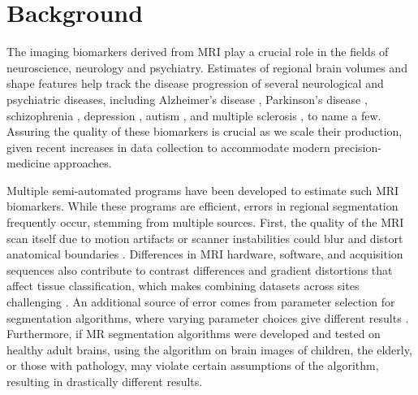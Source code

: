 \section{Background}


The imaging biomarkers derived from MRI play a crucial role in the fields of neuroscience, neurology and psychiatry. Estimates of regional brain volumes and shape features help track the disease progression of several neurological and psychiatric diseases, including Alzheimer's disease \cite{18632739,Vemuri_2010}, Parkinson's disease \cite{Silvia_Mangia_2013}, schizophrenia \cite{shenton2001review}, depression \cite{meisenzahl2011structural}, autism \cite{brambilla2003brain}, and multiple sclerosis \cite{Filippi_1995}, to name a few. Assuring the quality of these biomarkers is crucial as we scale their production, given recent increases in data collection to accommodate modern precision-medicine approaches. 

Multiple semi-automated programs have been developed to estimate such MRI biomarkers. While these programs are efficient, errors in regional segmentation frequently occur, stemming from multiple sources. First, the quality of the MRI scan itself due to motion artifacts or scanner instabilities could blur and distort anatomical boundaries \cite{Blumenthal_2002,Pardoe_2016,Reuter_2015,Savalia_2016}. Differences in MRI hardware, software, and acquisition sequences also contribute to contrast differences and gradient distortions that affect tissue classification, which makes combining datasets across sites challenging \cite{keshavan2016power}. An additional source of error comes from parameter selection for segmentation algorithms, where varying parameter choices give different results \cite{Han_2006}. Furthermore, if MR segmentation algorithms were developed and tested on healthy adult brains, using the algorithm on brain images of children, the elderly, or those with pathology, may violate certain assumptions of the algorithm, resulting in drastically different results. 

